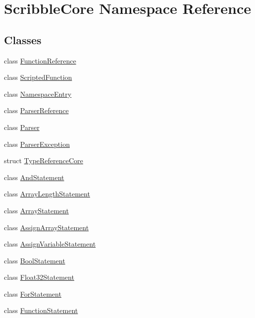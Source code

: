 \hypertarget{namespace_scribble_core}{\section{Scribble\-Core Namespace Reference}
\label{namespace_scribble_core}
}
\subsection*{Classes}
\begin{DoxyCompactItemize}
\item 
class \hyperlink{class_scribble_core_1_1_function_reference}{Function\-Reference}
\item 
class \hyperlink{class_scribble_core_1_1_scripted_function}{Scripted\-Function}
\item 
class \hyperlink{class_scribble_core_1_1_namespace_entry}{Namespace\-Entry}
\item 
class \hyperlink{class_scribble_core_1_1_parser_reference}{Parser\-Reference}
\item 
class \hyperlink{class_scribble_core_1_1_parser}{Parser}
\item 
class \hyperlink{class_scribble_core_1_1_parser_exception}{Parser\-Exception}
\item 
struct \hyperlink{struct_scribble_core_1_1_type_reference_core}{Type\-Reference\-Core}
\item 
class \hyperlink{class_scribble_core_1_1_and_statement}{And\-Statement}
\item 
class \hyperlink{class_scribble_core_1_1_array_length_statement}{Array\-Length\-Statement}
\item 
class \hyperlink{class_scribble_core_1_1_array_statement}{Array\-Statement}
\item 
class \hyperlink{class_scribble_core_1_1_assign_array_statement}{Assign\-Array\-Statement}
\item 
class \hyperlink{class_scribble_core_1_1_assign_variable_statement}{Assign\-Variable\-Statement}
\item 
class \hyperlink{class_scribble_core_1_1_bool_statement}{Bool\-Statement}
\item 
class \hyperlink{class_scribble_core_1_1_float32_statement}{Float32\-Statement}
\item 
class \hyperlink{class_scribble_core_1_1_for_statement}{For\-Statement}
\item 
class \hyperlink{class_scribble_core_1_1_function_statement}{Function\-Statement}
\item 

\end{DoxyCompactItemize}
